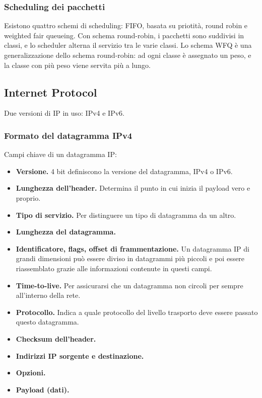 \documentclass[11pt]{article}
\begin{document}
\subsubsection{Scheduling dei pacchetti}
Esistono quattro schemi di scheduling: FIFO, basata su priotità, round robin e weighted fair queueing.
Con schema round-robin, i pacchetti sono suddivisi in classi, e lo scheduler alterna il servizio tra le varie classi. Lo 
schema WFQ è una generalizzazione dello schema round-robin: ad ogni classe è assegnato un peso, e la classe con più peso 
viene servita più a lungo.
\subsection{Internet Protocol}
Due versioni di IP in uso: IPv4 e IPv6.
\subsubsection{Formato del datagramma IPv4}
Campi chiave di un datagramma IP:
\begin{itemize}
    \item \textbf{Versione.} 4 bit definiscono la versione del datagramma, IPv4 o IPv6.
    \item \textbf{Lunghezza dell'header.} Determina il punto in cui inizia il payload vero e proprio.
    \item \textbf{Tipo di servizio.} Per distinguere un tipo di datagramma da un altro.
    \item \textbf{Lunghezza del datagramma.}
    \item \textbf{Identificatore, flags, offset di frammentazione.} Un datagramma IP di grandi dimensioni può essere diviso 
    in datagrammi più piccoli e poi essere riassemblato grazie alle informazioni contenute in questi campi.
    \item \textbf{Time-to-live.} Per assicurarsi che un datagramma non circoli per sempre all'interno della rete.
    \item \textbf{Protocollo.} Indica a quale protocollo del livello trasporto deve essere passato questo datagramma.
    \item \textbf{Checksum dell'header.}
    \item \textbf{Indirizzi IP sorgente e destinazione.}
    \item \textbf{Opzioni.}
    \item \textbf{Payload (dati).}
\end{itemize}
\end{document}
